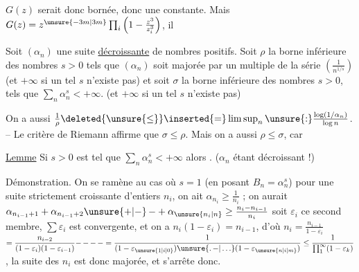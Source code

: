 $G(z)$ serait donc bornée, donc une constante.
Mais $G(z)=z^{\unsure{-3m|3m}}\prod_i\left(1-\frac{z^3}{z_i^3}\right)$, il


Soit $(\alpha_n)$ une suite \uline{décroissante}  de nombres
positifs. Soit $\rho$ la borne inférieure des nombres
 $s>0$ tels que $(\alpha_n)$ soit majorée par
un multiple de la série $\left(\frac{1}{n^{1/s}}\right)$ (et $+\infty$
si un tel $s$ n'existe pas) et soit $\sigma$ la
borne inférieure des nombres $s>0$, tels que
$\sum_n\alpha_n^s<+\infty$. (et $+\infty$ si un tel $s$ n'existe pas)

On a aussi $\frac1\rho\deleted{\unsure{\leq}}\inserted{=}\limsup_n\unsure{:}\frac{\log(1/\alpha_n)}{\log n}$.  -- Le critère de Riemann affirme
que \deleted{$\unsure{\rho\leq|\rho\leq\sigma}$} $\sigma\leq\rho$. Mais on a aussi $\rho\leq\sigma$,
car 

\uline{Lemme} \quad Si $s>0$ est tel que $\sum_n\alpha_n^s<+\infty$
alors \inserted{$\geq$}  . ($\alpha_n$ étant décroissant !)

Démonstration. On se ramène au cas où $s=1$
(en posant $B_n=\alpha_n^s$)   pour une suite
strictement croissante d'entiers $n_i$, on  ait
$\alpha_{n_i}\geq\frac1{n_i}$ ;  on aurait \quad $\alpha_{n_{i-1}+1}+\alpha_{n_{i-1}+2}\unsure{+|\mathord{-}}\,\mathord{-}+\alpha_{\unsure{n_i|n}}\geq\frac{n_i-n_{i-1}}{n_i}$
soit $\varepsilon_i$ ce second membre, $\sum\varepsilon_i$ est 
convergente, et on a $n_i(1-\varepsilon_i)=n_{i-1}$, d'où $n_i=\frac{n_{i-1}}{1-\varepsilon_i}$
$\displaystyle =\frac{n_{i-2}}{(1-\varepsilon_i)(1-\varepsilon_{i-1})}\mathord{-}\,\mathord{-}\,\mathord{-}\,\mathord{-}=\frac1{(1-\varepsilon_{\unsure{1|i|0}})\unsure{\mathord{.}\,\mathord{-}|\ldots}(1-\varepsilon_{\unsure{n|i|m}})}\leq\frac1{\prod_1^\infty(1-\varepsilon_k)}$, la suite
des $n_i$ est donc majorée, et s'arrête donc.


